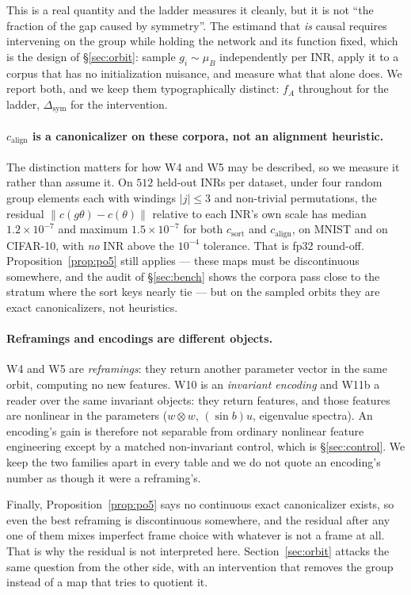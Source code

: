 \documentclass[10pt,twocolumn,letterpaper]{article}
\theoremstyle{definition}
\newcommand{\csort}{c_{\mathrm{sort}}}
\newcommand{\calign}{c_{\mathrm{align}}}
\begin{document}
This is a real quantity and the ladder measures it cleanly, but it is not ``the fraction of the gap
caused by symmetry''. The estimand that \emph{is} causal requires intervening on the group while
holding the network and its function fixed, which is the design of \S\ref{sec:orbit}: sample
$g_i \sim \mu_B$ independently per INR, apply it to a corpus that has no initialization nuisance,
and measure what that alone does. We report both, and we keep them typographically distinct: $f_A$
throughout for the ladder, $\Delta_{\mathrm{sym}}$ for the intervention.

\paragraph{$\calign$ is a canonicalizer on these corpora, not an alignment heuristic.} The
distinction matters for how W4 and W5 may be described, so we measure it rather than assume it. On
$512$ held-out INRs per dataset, under four random group elements each with windings $|j|\le3$ and
non-trivial permutations, the residual $\|c(g\theta) - c(\theta)\|$ relative to each INR's own scale
has median $1.2\times10^{-7}$ and maximum $1.5\times10^{-7}$ for both $\csort$ and $\calign$, on
MNIST and on CIFAR-10, with \emph{no} INR above the $10^{-4}$ tolerance. That is fp32 round-off.
Proposition~\ref{prop:po5} still applies --- these maps must be discontinuous somewhere, and the
audit of \S\ref{sec:bench} shows the corpora pass close to the stratum where the sort keys nearly
tie --- but on the sampled orbits they are exact canonicalizers, not heuristics.

\paragraph{Reframings and encodings are different objects.} W4 and W5 are \emph{reframings}: they
return another parameter vector in the same orbit, computing no new features. W10 is an
\emph{invariant encoding} and W11b a reader over the same invariant objects: they return features,
and those features are nonlinear in the parameters ($w \otimes w$, $(\sin b)u$, eigenvalue spectra).
An encoding's gain is therefore not separable from ordinary nonlinear feature engineering except by
a matched non-invariant control, which is \S\ref{sec:control}. We keep the two families apart in
every table and we do not quote an encoding's number as though it were a reframing's.

Finally, Proposition~\ref{prop:po5} says no continuous exact canonicalizer exists, so even the best
reframing is discontinuous somewhere, and the residual after any one of them mixes imperfect frame
choice with whatever is not a frame at all. That is why the residual is not interpreted here.
Section~\ref{sec:orbit} attacks the same question from the other side, with an intervention that
removes the group instead of a map that tries to quotient it.
\end{document}
